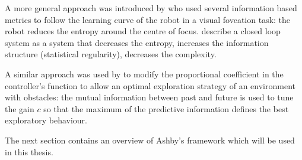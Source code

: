 A more general approach was introduced by \citet{LungarellaInformation} who
used several information based metrics to follow the learning curve of the robot
in a visual foveation task: the robot reduces the entropy around the centre of focus.
\citet{LungarellaInformation} describe a closed loop system as a system that
decreases the entropy, increases the information structure (statistical regularity),
decreases the complexity.

A similar approach was used by \citet{Ay2008:PredInformation} to modify the proportional
coefficient in the controller's function to allow an optimal exploration strategy
of an environment with obstacles: the mutual information between past and future
is used to tune the gain $c$ so that the maximum of the predictive information defines the best exploratory
behaviour.

The next section contains an overview of Ashby's framework which will be used in this thesis.

